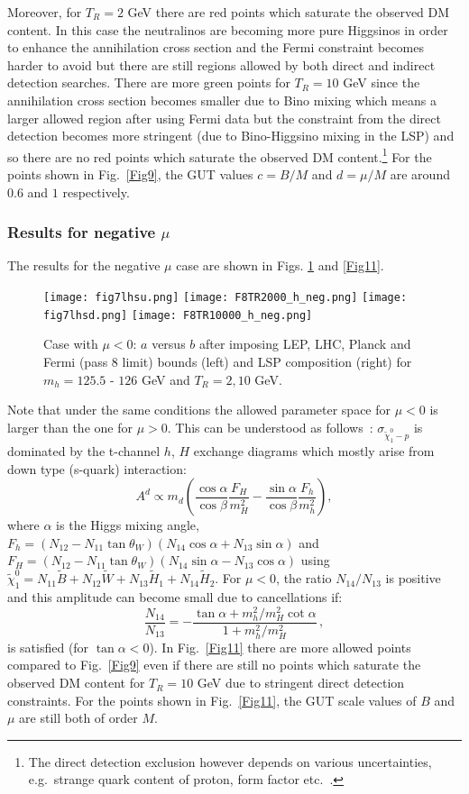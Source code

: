 \documentclass[11pt,a4paper]{article}
\newcommand{\be}{\begin{equation}}
\newcommand{\ee}{\end{equation}}
\begin{document}
Moreover, for $T_R=2$ GeV there are red points which saturate the observed DM content. In this case the neutralinos are becoming more pure Higgsinos in order to enhance the annihilation cross section and the Fermi constraint becomes harder to avoid but there are still regions allowed by both direct and indirect detection searches. There are more green points for $T_R=10$ GeV since the annihilation cross section becomes smaller due to Bino mixing which means a larger allowed region after using Fermi data but the constraint from the direct detection becomes more stringent (due to Bino-Higgsino mixing in the LSP) and so there are no red points which saturate the observed DM content.\footnote{The direct detection exclusion however depends on various uncertainties, e.g.~strange quark content of proton, form factor etc.~\cite{Accomando:1999eg}.} For the points shown in Fig.~\ref{Fig9}, the GUT values $c= B/M$ and $d=\mu/M$ are around $0.6$ and $1$ respectively.

\subsubsection{Results for negative $\mu$}

The results for the negative $\mu$ case are shown in Figs. \ref{Fig10} and \ref{Fig11}. 
\begin{figure}[!ht]
\centering
\texttt{[image: fig7lhsu.png]}
\texttt{[image: F8TR2000\_h\_neg.png]}
\texttt{[image: fig7lhsd.png]}
\texttt{[image: F8TR10000\_h\_neg.png]}
\caption{Case with $\mu<0$: $a$ versus $b$ after imposing LEP, LHC, Planck and Fermi (pass 8 limit) bounds (left)
and LSP composition (right) for $m_h = 125.5$ - $126$ GeV and $T_R = 2, 10$ GeV.}
\label{Fig10}
\end{figure}
Note that under the same conditions the allowed parameter space for $\mu<0$ is larger than the one for $\mu>0$. This can be understood as follows~\cite{positivemu}: $\sigma_{\tilde\chi^0_1-p}$ is dominated by the t-channel $h$, $H$ exchange diagrams which mostly arise from down type (s-quark) interaction:
\be
A^d\propto m_d\left({\frac{\cos\alpha}{\cos\beta}}{\frac{F_H}{m_H^2}}-{\frac{\sin\alpha}{\cos\beta}}{\frac{F_h}{m_h^2}}\right),
\ee
where $\alpha$ is the Higgs mixing angle, $F_h=(N_{12}-N_{11}\tan\theta_W)(N_{14}\cos\alpha+N_{13}\sin\alpha)$ and $F_H=(N_{12}-N_{11}\tan\theta_W)(N_{14}\sin\alpha-N_{13}\cos\alpha)$ using $\tilde\chi^0_1=N_{11}\tilde B+N_{12}\tilde W+N_{13}\tilde H_1+N_{14}\tilde H_2$. For $\mu<0$, the ratio $N_{14}/N_{13}$ is positive and this amplitude can become small due to cancellations if:
\be
\frac{N_{14}}{N_{13}}=- {\frac{\tan\alpha+m_h^2/m_H^2 \cot\alpha}{1+m_h^2/m_H^2}}\,,
\ee
is satisfied (for $\tan\alpha<0$). In Fig.~\ref{Fig11} there are more allowed points compared to Fig.~\ref{Fig9} even if there are still no points which saturate the observed DM content for $T_R=10$ GeV due to stringent direct detection constraints. For the points shown in Fig.~\ref{Fig11}, the GUT scale values of $B$ and $\mu$ are still both of order $M$.
\end{document}

